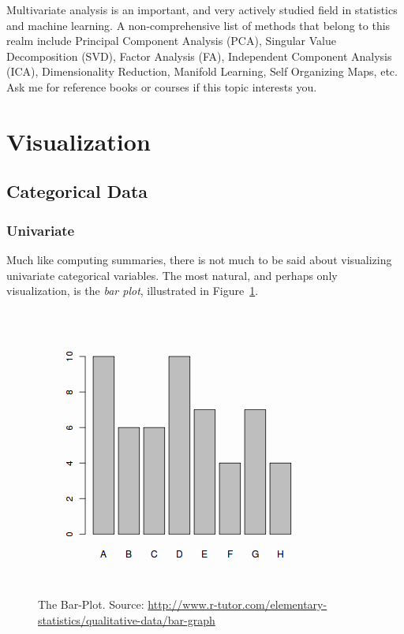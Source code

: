 \documentclass[12pt,a4paper]{report}
\begin{document}
\begin{extra}
Multivariate analysis is an important, and very actively studied field in statistics and machine learning.
A non-comprehensive list of methods that belong to this realm include 
Principal Component Analysis (PCA),
Singular Value Decomposition (SVD), 
Factor Analysis (FA), 
Independent Component Analysis (ICA),
Dimensionality Reduction, 
Manifold Learning, 
Self Organizing Maps, 
etc.
Ask me for reference books or courses if this topic interests you.
\end{extra}



\section{Visualization}

\subsection{Categorical Data}

\subsubsection{Univariate}
Much like computing summaries, there is not much to be said about visualizing univariate categorical variables. 
The most natural, and perhaps only visualization, is the \emph{bar plot}, illustrated in Figure~\ref{fig:barplot}.

\begin{figure}[t]
\centering
\includegraphics[width=0.7\linewidth]{art/categorical-data1x}
\caption[Bar Plot]{The Bar-Plot. Source: \url{http://www.r-tutor.com/elementary-statistics/qualitative-data/bar-graph}}
\label{fig:barplot}
\end{figure}
\end{document}
